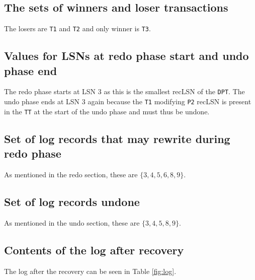 \subsection{The sets of winners and loser transactions}
The losers are {\tt T1} and {\tt T2} and only winner is {\tt T3}.

\subsection{Values for LSNs at redo phase start and undo phase end}
The redo phase starts at LSN 3 as this is the smallest recLSN of the {\tt DPT}. The undo phase ends at LSN 3 again because the {\tt T1} modifying {\tt P2} recLSN is present in the {\tt TT} at the start of the undo phase and must thus be undone.

\subsection{Set of log records that may rewrite during redo phase}
As mentioned in the redo section, these are $\{3,4,5,6,8,9\}$.

\subsection{Set of log records undone}
As mentioned in the undo section, these are $\{3,4,5,8,9\}$.

\subsection{Contents of the log after recovery}
The log after the recovery can be seen in Table \ref{fig:log}.

